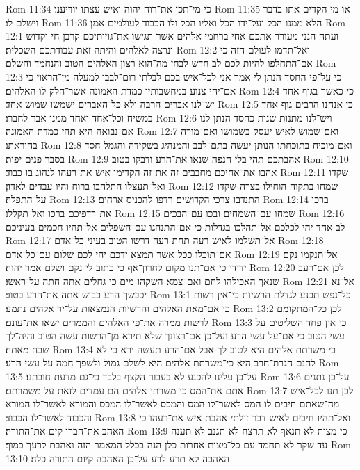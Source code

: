 Rom 11:34  כי מי־תכן את־רוח יהוה ואיש עצתו יודיענו׃
Rom 11:35  או מי הקדים אתו בדבר וישלם לו׃
Rom 11:36  הלא ממנו הכל ועל־ידו הכל ואליו הכל ולו הכבוד לעולמים אמן׃
Rom 12:1  ועתה הנני מעורר אתכם אחי ברחמי אלהים אשר תגישו את־גויותיכם קרבן חי וקדוש ונרצה לאלהים והיתה זאת עבודתכם השכלית׃
Rom 12:2  ואל־תדמו לעולם הזה כי אם־התחלפו להיות לכם לב חדש לבחן מה־הוא רצון האלהים הטוב והנחמד והשלם׃
Rom 12:3  כי על־פי החסד הנתן לי אמר אני לכל־איש בכם לבלתי רום־לבבו למעלה מן־הראוי כי אם־יהי צנוע במחשבותיו כמדת האמונה אשר־חלק לו האלהים׃
Rom 12:4  כי כאשר בגוף אחד יש־לנו אברים הרבה ולא כל־האברים ישמשו שמוש אחד׃
Rom 12:5  כן אנחנו הרבים גוף אחד במשיח וכל־אחד ואחד ממנו אבר לחברו׃
Rom 12:6  ויש־לנו מתנות שנות כחסד הנתן לנו אם־נבואה היא תהי כמדת האמונה׃
Rom 12:7  ואם־שמוש לאיש יעסק בשמושו ואם־מורה בהוראתו׃
Rom 12:8  ואם־מוכיח בתוכחתו הנותן יעשה בתם־לבב והמנהיג בשקידה והגמל חסד בסבר פנים יפות׃
Rom 12:9  אהבתכם תהי בלי חנפה שנאו את־הרע ודבקו בטוב׃
Rom 12:10  אהבו את־אחיכם מחבבים זה את־זה הקדימו איש את־רעהו לנהוג בו כבוד׃
Rom 12:11  שקדו ואל־תעצלו התלהבו ברוח והיו עבדים לאדון׃
Rom 12:12  שמחו בתקוה הוחילו בצרה שקדו על־התפלה׃
Rom 12:13  התנדבו צרכי הקדושים רדפו להכניס ארחים׃
Rom 12:14  ברכו את־רדפיכם ברכו ואל־תקללו׃
Rom 12:15  שמחו עם־השמחים ובכו עם־הבכים׃
Rom 12:16  לב אחד יהי לכלכם אל־תהלכו בגדלות כי אם־התנהגו עם־השפלים אל־תהיו חכמים בעיניכם׃
Rom 12:17  אל־תשלמו לאיש רעה תחת רעה דרשו הטוב בעיני כל־אדם׃
Rom 12:18  אם־תוכלו ככל־אשר תמצא ידכם יהי לכם שלום עם־כל־אדם׃
Rom 12:19  אל־תנקמו נקם ידידי כי אם־תנו מקום לחרון־אף כי כתוב לי נקם ושלם אמר יהוה׃
Rom 12:20  לכן אם־רעב שנאך האכילהו לחם ואם־צמא השקהו מים כי גחלים אתה חתה על־ראשו׃
Rom 12:21  אל־נא יכבשך הרע כבוש אתה את־הרע בטוב׃
Rom 13:1  כל־נפש תכנע לגדלת הרשיות כי־אין רשות כי אם־מאת האלהים והרשיות הנמצאות על־יד אלהים נתמנו׃
Rom 13:2  לכן כל־המתקומם לרשות ממרה את־פי האלהים והממרים ישאו את־עונם׃
Rom 13:3  כי אין פחד השליטים על עשי הטוב כי אם־על עשי הרע ועל־כן אם־רצונך שלא תירא מן־הרשות עשה הטוב והיה־לך שבח מאתה׃
Rom 13:4  כי משרתת אלהים היא לטוב לך אבל אם־הרע תעשה ירא כי לא לחנם חגרת־חרב היא כי־משרתת אלהים היא לשלם גמול ולשפך חמה על עשי הרע׃
Rom 13:5  על־כן עלינו להכנע לא בעבור הקצף בלבד כי־גם מדעת חובתנו׃
Rom 13:6  על־כן נתנים אתם את־המס כי משרתי אלהים הם עמדים לזאת על משמרתם׃
Rom 13:7  לכן תנו לכל־איש מה־שאתם חיבים לו המס לאשר־לו המס והמכס לאשר־לו המכס והמורא לאשר־לו המורא והכבוד לאשר־לו הכבוד׃
Rom 13:8  ואל־תהיו חיבים לאיש דבר זולתי אהבת איש את־רעהו כי האהב את־חברו קים את־התורה׃
Rom 13:9  כי מצות לא תנאף לא תרצח לא תגנב לא תענה עד שקר לא תחמד עם כל־מצות אחרות כלן הנה בכלל המאמר הזה ואהבת לרעך כמוך׃
Rom 13:10  האהבה לא תרע לרע על־כן האהבה קיום התורה כלה׃
